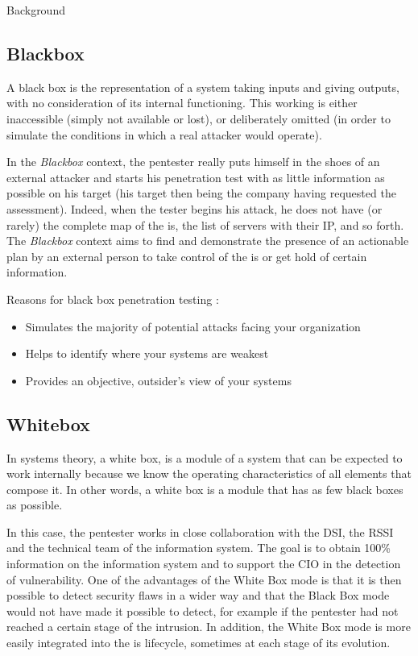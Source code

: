 \begin{chaptercover}{Background}
\subsection{Blackbox}

A black box is the representation of a system taking inputs and giving outputs, with no consideration of its internal functioning. This working is either inaccessible (simply not available or lost), or deliberately omitted (in order to simulate the conditions in which a real attacker would operate).

In the \textit{Blackbox} context, the pentester really puts himself in the shoes of an external attacker and starts his penetration test with as little information as possible on his target (his target then being the company having requested the assessment). Indeed, when the tester begins his attack, he does not have (or rarely) the complete map of the \acrshort{is}, the list of servers with their IP, and so forth. The \textit{Blackbox} context aims to find and demonstrate the presence of an actionable plan by an external person to take control of the \acrshort{is} or get hold of certain information.

Reasons for black box penetration testing :

\begin{itemize} \vspace{-.2cm}
  \item[\checkmark] Simulates the majority of potential attacks facing your organization
  \item[\checkmark] Helps to identify where your systems are weakest
  \item[\checkmark] Provides an objective, outsider’s view of your systems
\end{itemize}

\subsection{Whitebox}

In systems theory, a white box, is a module of a system that can be expected to work internally because we know the operating characteristics of all elements that compose it. In other words, a white box is a module that has as few black boxes as possible.

In this case, the pentester works in close collaboration with the DSI, the RSSI and the technical team of the information system. The goal is to obtain 100\% information on the information system and to support the CIO in the detection of vulnerability. One of the advantages of the White Box mode is that it is then possible to detect security flaws in a wider way and that the Black Box mode would not have made it possible to detect, for example if the pentester had not reached a certain stage of the intrusion. In addition, the White Box mode is more easily integrated into the \acrshort{is} lifecycle, sometimes at each stage of its evolution.


\end{chaptercover}

